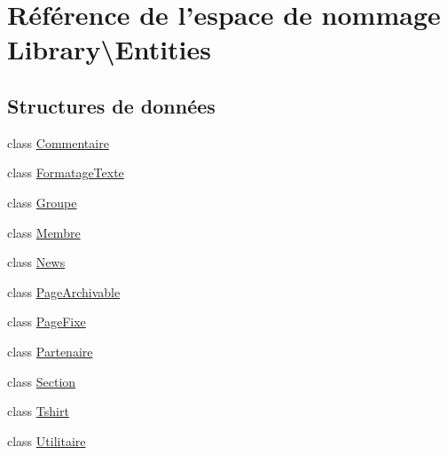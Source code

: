 \hypertarget{namespace_library_1_1_entities}{\section{Référence de l'espace de nommage Library\textbackslash{}Entities}
\label{namespace_library_1_1_entities}
}
\subsection*{Structures de données}
\begin{DoxyCompactItemize}
\item 
class \hyperlink{class_library_1_1_entities_1_1_commentaire}{Commentaire}
\item 
class \hyperlink{class_library_1_1_entities_1_1_formatage_texte}{Formatage\+Texte}
\item 
class \hyperlink{class_library_1_1_entities_1_1_groupe}{Groupe}
\item 
class \hyperlink{class_library_1_1_entities_1_1_membre}{Membre}
\item 
class \hyperlink{class_library_1_1_entities_1_1_news}{News}
\item 
class \hyperlink{class_library_1_1_entities_1_1_page_archivable}{Page\+Archivable}
\item 
class \hyperlink{class_library_1_1_entities_1_1_page_fixe}{Page\+Fixe}
\item 
class \hyperlink{class_library_1_1_entities_1_1_partenaire}{Partenaire}
\item 
class \hyperlink{class_library_1_1_entities_1_1_section}{Section}
\item 
class \hyperlink{class_library_1_1_entities_1_1_tshirt}{Tshirt}
\item 
class \hyperlink{class_library_1_1_entities_1_1_utilitaire}{Utilitaire}
\end{DoxyCompactItemize}


